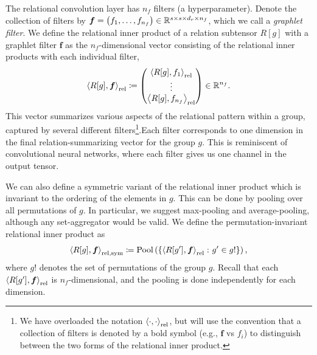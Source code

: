 The relational convolution layer has $n_f$ filters (a hyperparameter). Denote the collection of filters by $\boldsymbol{f} = \left(f_1, \ldots, f_{n_f}\right) \in \mathbb{R}^{s \times s \times d_r \times n_f}$, which we call a \textit{graphlet filter}. We define the relational inner product of a relation subtensor $R[g]$ with a graphlet filter $\bm{f}$ as the $n_f$-dimensional vector consisting of the relational inner products with each individual filter,
\begin{equation}
    \label{eq:relational_inner_prod}
    \left\langle R[g], \bm{f} \right\rangle_\mathrm{rel} \coloneq \begin{pmatrix} \left\langle R[g], f_1 \right\rangle_\mathrm{rel} \\ \vdots 
 \\ \left\langle R[g], f_{n_f} \right\rangle_\mathrm{rel} \end{pmatrix} \in \mathbb{R}^{n_f}.
\end{equation}
This vector summarizes various aspects of the relational pattern within a group, captured by several different filters\footnote{We have overloaded the notation $\left\langle \cdot, \cdot \right\rangle_\mathrm{rel}$, but will use the convention that a collection of filters is denoted by a bold symbol (e.g., $\bm{f}$ vs $f_i$) to distinguish between the two forms of the relational inner product.}.Each filter corresponds to one dimension in the final relation-summarizing vector for the group $g$. This is reminiscent of convolutional neural networks, where each filter gives us one channel in the output tensor.

We can also define a symmetric variant of the relational inner product which is invariant to the ordering of the elements in $g$. This can be done by pooling over all permutations of $g$. In particular, we suggest max-pooling and average-pooling, although any set-aggregator would be valid. We define the permutation-invariant relational inner product as
\begin{equation}\label{eq:symmetric_relational_inner_prod}
    \left \langle R[g], \bm{f} \right\rangle_{\mathrm{rel}, \mathrm{sym}} \coloneq \mathrm{Pool}\left(\left\{\left\langle R[g'], \bm{f} \right\rangle_\mathrm{rel} \colon g' \in g!\right\}\right),
\end{equation}
where $g!$ denotes the set of permutations of the group $g$. Recall that each $\left \langle R[g'], \bm{f} \right\rangle_{\mathrm{rel}}$ is $n_f$-dimensional, and the pooling is done independently for each dimension.


